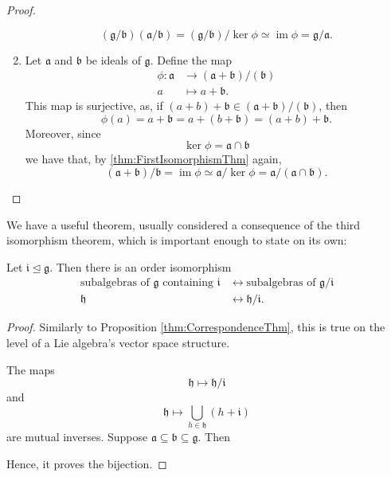 \documentclass{article}
\DeclareMathOperator{\im}{im}
\newcommand*\frka{{\ensuremath{\mathfrak{a}}}}
\newcommand*\frkb{{\ensuremath{\mathfrak{b}}}}
\newcommand*\frkg{{\ensuremath{\mathfrak{g}}}}
\newcommand*\frkh{{\ensuremath{\mathfrak{h}}}}
\newcommand*\frki{{\ensuremath{\mathfrak{i}}}}
\begin{document}
\begin{proof}
\begin{enumerate}[label=(\alph*)]
            \[
                (\frkg/\frkb)(\frka/\frkb)
                =
                (\frkg/\frkb)/\ker\phi
                \simeq
                \im\phi
                =
                \frkg/\frka.
            \]
        \item 
            Let $\frka$ and $\frkb$ be ideals of $\frkg$.
            Define the map
            \begin{align*}
                \phi:
                \frka 
                &\to 
                (\frka+\frkb)/(\frkb)
                \\
                a
                &\mapsto
                a + \frkb.
            \end{align*}
            This map is surjective, as, if $(a + b) + \frkb \in (\frka+\frkb)/(\frkb)$, then
            \[
                \phi(a)
                =
                a + \frkb
                =
                a + (b + \frkb)
                =
                (a + b) + \frkb.
            \]
            Moreover, since
            \[
                \ker \phi
                =
                \frka \cap \frkb
            \]
            we have that, by \ref{thm:FirstIsomorphismThm} again,
            \[
                (\frka+\frkb)/\frkb
                =
                \im \phi
                \simeq
                \frka/\ker\phi
                =
                \frka/(\frka \cap \frkb).
            \]
    \end{enumerate}
\end{proof}

We have a useful theorem, usually considered a consequence of the third isomorphism theorem, which is important enough to state on its own:

\begin{theorem}
    \label{thm:CorrespondenceThm}
    Let $\frki \trianglelefteq \frkg$.
    Then there is an order isomorphism  
    \begin{align*}
        \text{subalgebras of $\frkg$ containing $\frki$}
        &\leftrightarrow
        \text{subalgebras of $\frkg/\frki$}
        \\
        \frkh
        &\leftrightarrow
        \frkh/\frki.
    \end{align*}
\end{theorem}

\begin{proof}
    Similarly to Proposition \ref{thm:CorrespondenceThm}, this is true on the level of a Lie algebra's vector space structure.

    The maps
    \[
        \frkh \mapsto \frkh/\frki
    \]
    and
    \[
        \frkh \mapsto \bigcup_{h \in \frkh} (h + \frki)
    \]
    are mutual inverses.
    Suppose $\frka \subseteq \frkb \subseteq \frkg$.
    Then 

    Hence, it proves the bijection.
\end{proof}
\end{document}
